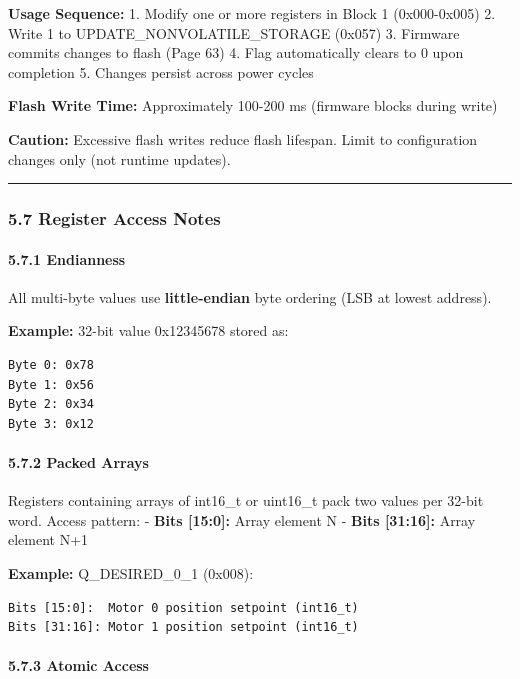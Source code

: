 \documentclass[
  11pt,
]{article}
\begin{document}
\textbf{Usage Sequence:} 1. Modify one or more registers in Block 1
(0x000-0x005) 2. Write 1 to UPDATE\_NONVOLATILE\_STORAGE (0x057) 3.
Firmware commits changes to flash (Page 63) 4. Flag automatically clears
to 0 upon completion 5. Changes persist across power cycles

\textbf{Flash Write Time:} Approximately 100-200 ms (firmware blocks
during write)

\textbf{Caution:} Excessive flash writes reduce flash lifespan. Limit to
configuration changes only (not runtime updates).

\begin{center}\rule{0.5\linewidth}{0.5pt}\end{center}

\subsubsection{5.7 Register Access Notes}\label{register-access-notes}

\paragraph{5.7.1 Endianness}\label{endianness}

All multi-byte values use \textbf{little-endian} byte ordering (LSB at
lowest address).

\textbf{Example:} 32-bit value 0x12345678 stored as:

\begin{verbatim}
Byte 0: 0x78
Byte 1: 0x56
Byte 2: 0x34
Byte 3: 0x12
\end{verbatim}

\paragraph{5.7.2 Packed Arrays}\label{packed-arrays}

Registers containing arrays of int16\_t or uint16\_t pack two values per
32-bit word. Access pattern: - \textbf{Bits {[}15:0{]}:} Array element N
- \textbf{Bits {[}31:16{]}:} Array element N+1

\textbf{Example:} Q\_DESIRED\_0\_1 (0x008):

\begin{verbatim}
Bits [15:0]:  Motor 0 position setpoint (int16_t)
Bits [31:16]: Motor 1 position setpoint (int16_t)
\end{verbatim}

\paragraph{5.7.3 Atomic Access}\label{atomic-access}
\end{document}
